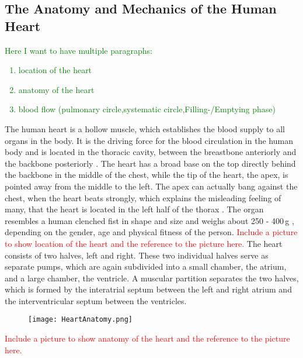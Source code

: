 \subsection{The Anatomy and Mechanics of the Human Heart}
\label{anatomy}
\textcolor{green}{
	Here I want to have multiple paragraphs:
	\begin{enumerate}
  		\item location of the heart  
  		\item anatomy of the heart
  		\item blood flow (pulmonary circle,systematic circle,Filling-/Emptying phase)
	\end{enumerate}
}
The human heart is a hollow muscle, which establishes the blood supply to all organs in the body. It is the driving force for the blood circulation in the human body and is located in the thoracic cavity, between the breastbone anteriorly and the backbone posteriorly \cite{sherwood07}. The heart has a broad base on the top directly behind the backbone in the middle of the chest, while the tip of the heart, the apex, is pointed away from the middle to the left. The apex can actually bang against the chest, when the heart beats strongly, which explains the misleading feeling of many, that the heart is located in the left half of the thorax \cite{sherwood07}. The organ resembles a human clenched fist in shape and size and weighs about 250 - 400\,g \cite{schwegler11}, depending on the gender, age and physical fitness of the person. \textcolor{red}{Include a picture to show location of the heart and the reference to the picture here.} 
\newline
The heart consists of two halves, left and right. These two individual halves serve as separate pumps, which are again subdivided into a small chamber, the atrium, and a large chamber, the ventricle. A muscular partition separates the two halves, which is formed by the interatrial septum between the left and right atrium and the interventricular septum between the ventricles.
\begin{figure}
\texttt{[image: HeartAnatomy.png]}
\end{figure}
\textcolor{red}{Include a picture to show anatomy of the heart and the reference to the picture here.} 
\newline


